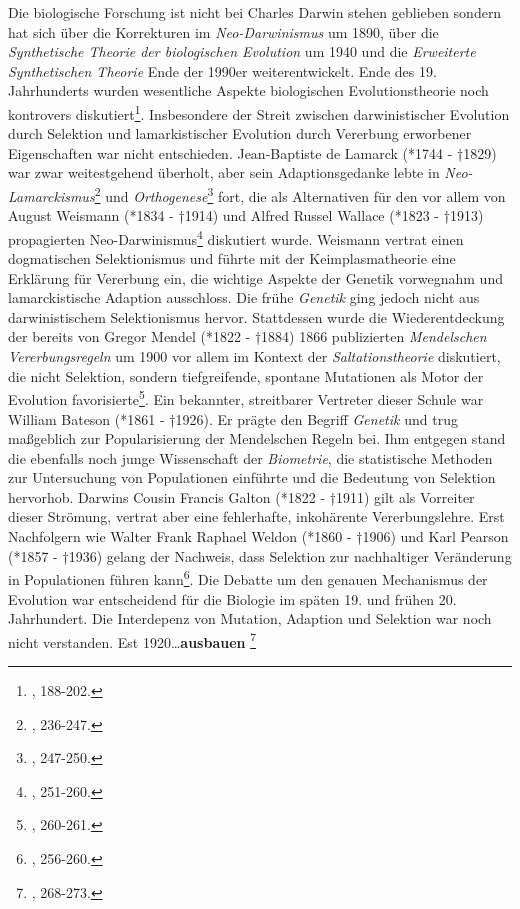 \documentclass[openany,twoside,twocolumn]{book}
\let\rmarkdownfootnote\footnote%
\def\footnote{\protect\rmarkdownfootnote}
\begin{document}
Die biologische Forschung ist nicht bei Charles Darwin stehen geblieben
sondern hat sich über die Korrekturen im \emph{Neo-Darwinismus} um 1890,
über die \emph{Synthetische Theorie der biologischen Evolution} um 1940
und die \emph{Erweiterte Synthetischen Theorie} Ende der 1990er
weiterentwickelt. Ende des 19. Jahrhunderts wurden wesentliche Aspekte
biologischen Evolutionstheorie noch kontrovers diskutiert\footnote{\textcite{bowler_evolution_1989},
  188-202.}. Insbesondere der Streit zwischen darwinistischer Evolution
durch Selektion und lamarkistischer Evolution durch Vererbung erworbener
Eigenschaften war nicht entschieden. Jean-Baptiste de Lamarck (*1744 -
†1829) war zwar weitestgehend überholt, aber sein Adaptionsgedanke lebte
in \emph{Neo-Lamarckismus}\footnote{\textcite{bowler_evolution_1989},
  236-247.} und \emph{Orthogenese}\footnote{\textcite{bowler_evolution_1989},
  247-250.} fort, die als Alternativen für den vor allem von August
Weismann (*1834 - †1914) und Alfred Russel Wallace (*1823 - †1913)
propagierten Neo-Darwinismus\footnote{\textcite{bowler_evolution_1989},
  251-260.} diskutiert wurde. Weismann vertrat einen dogmatischen
Selektionismus und führte mit der Keimplasmatheorie eine Erklärung für
Vererbung ein, die wichtige Aspekte der Genetik vorwegnahm und
lamarckistische Adaption ausschloss. Die frühe \emph{Genetik} ging
jedoch nicht aus darwinistischem Selektionismus hervor. Stattdessen
wurde die Wiederentdeckung der bereits von Gregor Mendel (*1822 - †1884)
1866 publizierten \emph{Mendelschen Vererbungsregeln} um 1900 vor allem
im Kontext der \emph{Saltationstheorie} diskutiert, die nicht Selektion,
sondern tiefgreifende, spontane Mutationen als Motor der Evolution
favorisierte\footnote{\textcite{bowler_evolution_1989}, 260-261.}. Ein
bekannter, streitbarer Vertreter dieser Schule war William Bateson
(*1861 - †1926). Er prägte den Begriff \emph{Genetik} und trug
maßgeblich zur Popularisierung der Mendelschen Regeln bei. Ihm entgegen
stand die ebenfalls noch junge Wissenschaft der \emph{Biometrie}, die
statistische Methoden zur Untersuchung von Populationen einführte und
die Bedeutung von Selektion hervorhob. Darwins Cousin Francis Galton
(*1822 - †1911) gilt als Vorreiter dieser Strömung, vertrat aber eine
fehlerhafte, inkohärente Vererbungslehre. Erst Nachfolgern wie Walter
Frank Raphael Weldon (*1860 - †1906) und Karl Pearson (*1857 - †1936)
gelang der Nachweis, dass Selektion zur nachhaltiger Veränderung in
Populationen führen kann\footnote{\textcite{bowler_evolution_1989},
  256-260.}. Die Debatte um den genauen Mechanismus der Evolution war
entscheidend für die Biologie im späten 19. und frühen 20. Jahrhundert.
Die Interdepenz von Mutation, Adaption und Selektion war noch nicht
verstanden. Est 1920\ldots{}\textbf{ausbauen} \footnote{\textcite{bowler_evolution_1989},
  268-273.}
\end{document}
